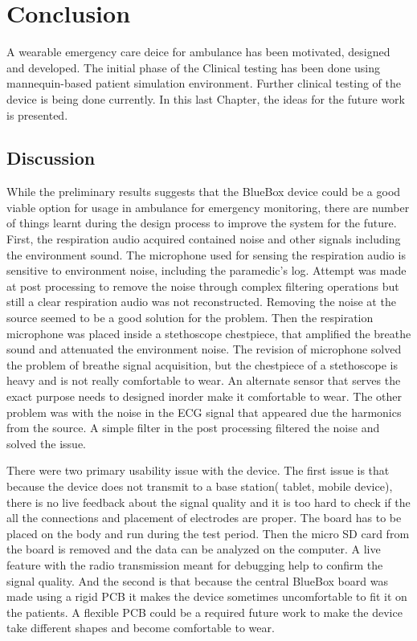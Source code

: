 \chapter{Conclusion}
A wearable emergency care deice for ambulance has been motivated, designed and developed. The initial phase of the Clinical testing has been done using mannequin-based patient simulation environment. Further clinical testing of the device is being done currently. In this last Chapter, the ideas for the future work is presented.

\section{Discussion}
While the preliminary results suggests that the BlueBox device could be a good viable option for usage in ambulance for emergency monitoring, there are number of things learnt during the design process to improve the system for the future. First, the respiration audio acquired contained noise and other signals including the environment sound. The microphone used for sensing the respiration audio is sensitive to environment noise, including the paramedic's log. Attempt was made at post processing to remove the noise through complex filtering operations but still a clear respiration audio was not reconstructed. Removing the noise at the source seemed to be a good solution for the problem. Then the respiration microphone was placed inside a stethoscope chestpiece, that amplified the breathe sound and attenuated the environment noise. The revision of microphone solved the problem of breathe signal acquisition, but the chestpiece of a stethoscope is heavy and is not really comfortable to wear. An alternate sensor that serves the exact purpose needs to designed inorder make it comfortable to wear. The other problem was with the noise in the ECG signal that appeared due the harmonics from the source. A simple filter in the post processing filtered the noise and solved the issue. 

\hspace{10mm}There were two primary usability issue with the device. The first issue is that because the device does not transmit to a base station( tablet, mobile device), there is no live feedback about the signal quality and it is too hard to check if the all the connections and placement of electrodes are proper. The board has to be placed on the body and run during the test period. Then the micro SD card from the board is removed and the data can be analyzed on the computer. A live feature with the radio transmission meant for debugging help to confirm the signal quality. And the second is that because the central BlueBox board was made using a rigid PCB it makes the device sometimes uncomfortable to fit it on the patients. A flexible PCB could be a required future work to make the device take different shapes and become comfortable to wear. 

